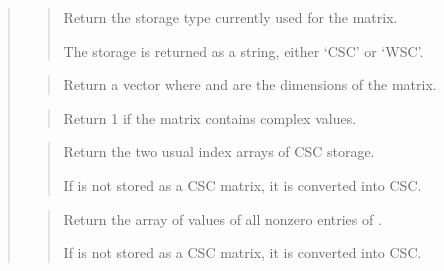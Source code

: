 \documentclass[a4paper,11pt,english]{sphinxmanual}
\begin{document}
\begin{quote}
\sphinxAtStartPar
{}
\begin{quote}

\sphinxAtStartPar
Return the storage type currently used for the matrix.

\sphinxAtStartPar
The storage is returned as a string, either ‘CSC’ or ‘WSC’.
\end{quote}

\sphinxAtStartPar
{}
\begin{quote}

\sphinxAtStartPar
Return a vector where  and  are the dimensions of the matrix.
\end{quote}

\sphinxAtStartPar
{}
\begin{quote}

\sphinxAtStartPar
Return 1 if the matrix contains complex values.
\end{quote}

\sphinxAtStartPar
{}
\begin{quote}

\sphinxAtStartPar
Return the two usual index arrays of CSC storage.

\sphinxAtStartPar
If  is not stored as a CSC matrix, it is converted into CSC.
\end{quote}

\sphinxAtStartPar
{}
\begin{quote}

\sphinxAtStartPar
Return the array of values of all non\sphinxhyphen{}zero entries of .

\sphinxAtStartPar
If  is not stored as a CSC matrix, it is converted into CSC.
\end{quote}

\sphinxAtStartPar
{}
\begin{quote}


\end{quote}
\end{quote}
\end{document}
